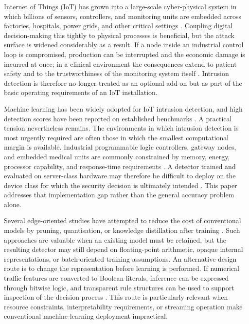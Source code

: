 \documentclass[journal,twoside,web]{ieeecolor}
\begin{document}
 Internet of Things (IoT) has grown into a large-scale cyber-physical system in which billions of sensors, controllers, and monitoring units are embedded across factories, hospitals, power grids, and other critical settings \cite{hussain2020ml, algaradi2020survey}. Coupling digital decision-making this tightly to physical processes is beneficial, but the attack surface is widened considerably as a result. If a node inside an industrial control loop is compromised, production can be interrupted and the economic damage is incurred at once; in a clinical environment the consequences extend to patient safety and to the trustworthiness of the monitoring system itself \cite{zhukabayeva2025cybersecurity}. Intrusion detection is therefore no longer treated as an optional add-on but as part of the basic operating requirements of an IoT installation.

Machine learning has been widely adopted for IoT intrusion detection, and high detection scores have been reported on established benchmarks \cite{kikissagbe2024review, jouhari2024lightweight}. A practical tension nevertheless remains. The environments in which intrusion detection is most urgently required are often those in which the smallest computational margin is available. Industrial programmable logic controllers, gateway nodes, and embedded medical units are commonly constrained by memory, energy, processor capability, and response-time requirements \cite{wang2023lightweight}. A detector trained and evaluated on server-class hardware may therefore be difficult to deploy on the device class for which the security decision is ultimately intended \cite{kundu2025review}. This paper addresses that implementation gap rather than the general accuracy problem alone.

Several edge-oriented studies have attempted to reduce the cost of conventional models by pruning, quantisation, or knowledge distillation after training \cite{liu2025compression}. Such approaches are valuable when an existing model must be retained, but the resulting detector may still depend on floating-point arithmetic, opaque internal representations, or batch-oriented training assumptions. An alternative design route is to change the representation before learning is performed. If numerical traffic features are converted to Boolean literals, inference can be expressed through bitwise logic, and transparent rule structures can be used to support inspection of the decision process \cite{bacellar2017thermometer}. This route is particularly relevant when resource constraints, interpretability requirements, or streaming operation make conventional machine-learning deployment impractical.
\end{document}
